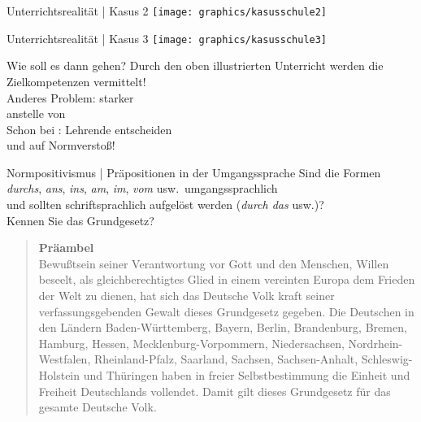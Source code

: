 \begin{frame}
  {Unterrichtsrealität | Kasus 2}
  \centering 
  \texttt{[image: graphics/kasusschule2]}\\
\end{frame}

\begin{frame}
  {Unterrichtsrealität | Kasus 3}
  \centering 
  \texttt{[image: graphics/kasusschule3]}\\
\end{frame}

\begin{frame}
  {Wie soll es dann gehen?}
  \onslide<+->
  \onslide<+->
  \centering 
  Durch den oben illustrierten Unterricht werden die Zielkompetenzen  vermittelt!\\
  \onslide<+->
  \Zeile
  \Large Anderes Problem: starker \\
  anstelle von \\
  \Zeile
  \onslide<+->
  \normalsize
  Schon bei \citet{Braun1979}: Lehrende entscheiden \\
  und  auf Normverstoß!
\end{frame}

\begin{frame}
  {Normpositivismus | Präpositionen in der Umgangssprache}
  \onslide<+->
  \onslide<+->
  Sind die Formen \alert{\textit{durchs}, \textit{ans}, \textit{ins}, \textit{am}, \textit{im}, \textit{vom}} usw.\ umgangssprachlich\\
   und sollten schriftsprachlich aufgelöst werden (\textit{durch das} usw.)?\\
  \Halbzeile
  \onslide<+->
  Kennen Sie das Grundgesetz?\\
  \Halbzeile
  \onslide<+->
  \begin{quote}\footnotesize
    \textbf{Präambel}\\
    
     Bewußtsein seiner Verantwortung vor Gott und den Menschen,  Willen beseelt, als gleichberechtigtes Glied in einem vereinten Europa dem Frieden der Welt zu dienen, hat sich das Deutsche Volk kraft seiner verfassungsgebenden Gewalt dieses Grundgesetz gegeben. Die Deutschen in den Ländern Baden-Württemberg, Bayern, Berlin, Brandenburg, Bremen, Hamburg, Hessen, Mecklenburg-Vorpommern, Niedersachsen, Nordrhein-Westfalen, Rheinland-Pfalz, Saarland, Sachsen, Sachsen-Anhalt, Schleswig-Holstein und Thüringen haben in freier Selbstbestimmung die Einheit und Freiheit Deutschlands vollendet. Damit gilt dieses Grundgesetz für das gesamte Deutsche Volk.
  \end{quote}
  \onslide<+->
  \Halbzeile
  \centering 
\end{frame}

